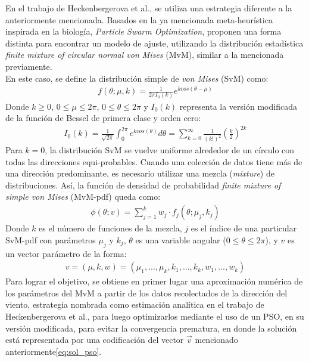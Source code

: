 En el trabajo de Heckenbergerova et al.\cite{Heckenbergerova15}, se utiliza una estrategia diferente a la anteriormente mencionada. Basados en la ya mencionada meta-heurística inspirada en la biología, \emph{Particle Swarm Optimization}, proponen una forma distinta para encontrar un modelo de ajuste, utilizando la distribución estadística \emph{finite mixture of circular normal von Mises} (MvM), similar a la mencionada previamente.\\ 
En este caso, se define la distribución simple de \emph{von Mises} (SvM) como:
\begin{align}
    f(\theta; \mu, k) = \frac{1}{2{\pi}I_{0}(k)}e^{k cos(\theta - \mu)}
\end{align}    
Donde $k \geq 0$, $0 \leq \mu \leq 2\pi$, $0 \leq \theta \leq 2\pi$ y $I_0(k)$ representa la versión modificada de la función de Bessel de primera clase y orden cero:
\begin{align}
    I_0(k) = \frac{1}{\sqrt{2\pi}}\int_0^{2\pi} e^{k cos(\theta)} d\theta = \sum_{k=0}^{\infty} \frac{1}{(k!)^2}(\frac{k}{2})^{2k}
\end{align}    
Para $k=0$, la distribución SvM se vuelve uniforme alrededor de un círculo con todas las direcciones equi-probables. Cuando una colección de datos tiene más de una dirección predominante, es necesario utilizar una mezcla (\emph{mixture}) de distribuciones.
Así, la función de densidad de probabilidad \emph{finite mixture of simple von Mises} (MvM-pdf) queda como:
\begin{align}
    \phi(\theta; v) = \sum_{j=1}^{k} w_j \cdot f_j(\theta; \mu_j, k_j)
\end{align}    
Donde $k$ es el número de funciones de la mezcla, $j$ es el índice de una particular SvM-pdf con parámetros $\mu_j$ y $k_j$, $\theta$ es una variable angular ($0 \leq \theta \leq 2\pi$), y $v$ es un vector parámetro de la forma:
 \begin{align}\label{eq:sol_pso}
    v = (\mu, k, w) = (\mu_1, ..., \mu_k,k_1,...,k_k,w_1,...,w_k)
\end{align}
Para lograr el objetivo, se obtiene en primer lugar una aproximación numérica de los parámetros del MvM a partir de los datos recolectados de la dirección del viento, estrategia nombrada como estimación analítica en el trabajo de Heckenbergerova et al., para luego optimizarlos mediante el uso de un PSO, en su versión modificada, para evitar la convergencia prematura, en donde la solución está representada por una codificación del vector $\vec{v}$ mencionado anteriormente\ref{eq:sol_pso}.\\ 
